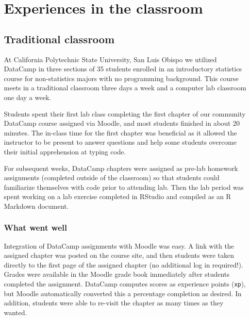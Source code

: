 \documentclass{tise_style_doi}
\begin{document}
\section{Experiences in the classroom}

\subsection{Traditional classroom}

At California Polytechnic State University, San Luis Obispo we utilized DataCamp
in three sections of 35 students enrolled in an introductory statistics course
for non-statistics majors with no programming background. This course meets in a 
traditional classroom three days a week and a computer lab classroom one day a week. 

Students spent their first lab class completing the first chapter of our community 
DataCamp course assigned via Moodle, and most students finished in about 20 minutes.  
The in-class time for the first chapter was beneficial as it allowed the instructor
to be present to answer questions and help some students overcome their initial 
apprehension at typing code.  

For subsequent weeks, DataCamp chapters were assigned as pre-lab homework assignments 
(completed outside of the classroom) so that students could familiarize themselves with 
code prior to attending lab.  Then the lab period was spent working on a lab exercise
completed in RStudio and compiled as an R Markdown document.

\subsubsection{What went well}

Integration of DataCamp assignments with Moodle was easy.  A link with the assigned
chapter was posted on the course site, and then students were taken directly to the 
first page of the assigned chapter (no additional log in required!). Grades were 
available in the Moodle grade book immediately after students completed the assignment.
DataCamp computes scores as experience points (\texttt{xp}), but Moodle automatically 
converted this a percentage completion as desired.  In addition, students were
able to re-visit the chapter as many times as they wanted.
\end{document}
